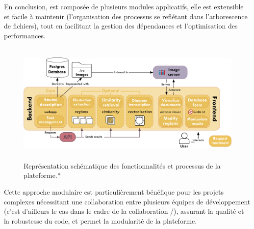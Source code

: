 

\vspace{2cm}

En conclusion, \aikon est
composée de plusieurs modules applicatifs, elle est extensible et facile à maintenir (l'organisation des processus se reflétant
dans l'arborescence de fichiers), tout
en facilitant la gestion des dépendances et l'optimisation des
performances. 

 \begin{figure}[H]
	\begin{center}
		\includegraphics[height=6cm]{figues/separate.png}
	\end{center}
	\caption{Représentation schématique des fonctionnalités et processus de la plateforme.*}
	\label{fig:fonct_separes} \end{figure}

Cette approche modulaire est particulièrement bénéfique
pour les projets complexes nécessitant une collaboration entre plusieurs
équipes de développement (c'est d'ailleurs le cas dans le cadre de la collaboration \eida/\vhs), assurant la qualité et la robustesse du code,
et permet la modularité de la plateforme.
